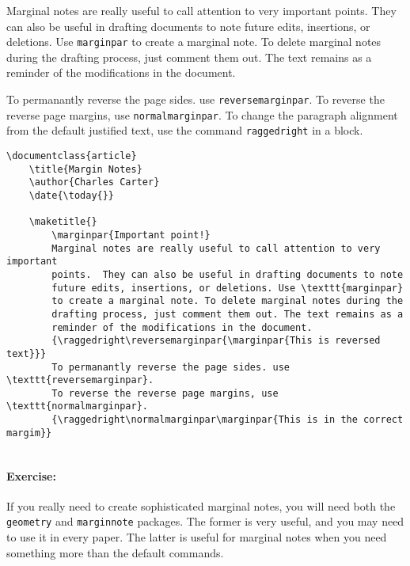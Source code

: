 
        Marginal notes are really useful to call attention to very important points.  They can also be useful in drafting documents to note future edits, insertions, or deletions. Use \texttt{marginpar} to create a marginal note. To delete marginal notes during the drafting process, just comment them out. The text remains as a reminder of the modifications in the document.

        {\raggedright{}}

        To permanantly reverse the page sides. use \texttt{reversemarginpar}. To reverse the reverse page margins, use \texttt{normalmarginpar}. To change the paragraph alignment from the default justified text, use the command \texttt{raggedright} in a block.

        {\raggedright\normalmarginpar{}}

        \begin{verbatim}
\documentclass{article}
    \title{Margin Notes}
    \author{Charles Carter}
    \date{\today{}}
 
    \maketitle{}
        \marginpar{Important point!}
        Marginal notes are really useful to call attention to very important 
        points.  They can also be useful in drafting documents to note 
        future edits, insertions, or deletions. Use \texttt{marginpar} 
        to create a marginal note. To delete marginal notes during the 
        drafting process, just comment them out. The text remains as a 
        reminder of the modifications in the document.
        {\raggedright\reversemarginpar{\marginpar{This is reversed text}}}
        To permanantly reverse the page sides. use \texttt{reversemarginpar}.
        To reverse the reverse page margins, use \texttt{normalmarginpar}.
        {\raggedright\normalmarginpar\marginpar{This is in the correct margim}}
    
        \end{verbatim}

        \paragraph{Exercise:} If you really need to create sophisticated marginal notes, you will need both the \texttt{geometry} and \texttt{marginnote} packages. The former is very useful, and you may need to use it in every paper. The latter is useful for marginal notes when you need something more than the default \LaTeXe{} commands.

